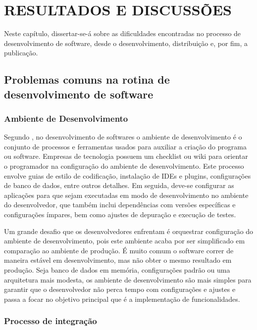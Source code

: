 \documentclass[
	12pt,				%
	openright,			%
	oneside,			%
	a4paper,			%
	chapter=TITLE,		%
	section=TITLE,		%
	english,			%
	french,				%
	spanish,			%
	brazil				%
	]{abntex2}
\begin{document}
\chapter{RESULTADOS E DISCUSSÕES}

Neste capítulo, dissertar-se-á sobre as dificuldades encontradas no processo de desenvolvimento de software, desde o desenvolvimento, distribuição e, por fim, a publicação.

\section{Problemas comuns na rotina de desenvolvimento de software}

\subsection{Ambiente de Desenvolvimento}

Segundo , no desenvolvimento de softwares o ambiente de desenvolvimento é o conjunto de processos e ferramentas usados para auxiliar a criação do programa ou software. Empresas de tecnologia possuem um checklist ou wiki para orientar o programador na configuração do ambiente de desenvolvimento. Este processo envolve guias de estilo de codificação, instalação de IDEs e plugins, configurações de banco de dados, entre outros detalhes. Em seguida, deve-se configurar as aplicações para que sejam executadas em modo de desenvolvimento no ambiente do desenvolvedor, que também inclui dependências com versões específicas e configurações ímpares, bem como ajustes de depuração e execução de testes.

Um grande desafio que os desenvolvedores enfrentam é orquestrar configuração do ambiente de desenvolvimento, pois este ambiente acaba por ser simplificado em comparação ao ambiente de produção. É muito comum o software correr de maneira estável em desenvolvimento, mas não obter o mesmo resultado em produção. Seja banco de dados em memória, configurações padrão ou uma arquitetura mais modesta, os ambiente de desenvolvimento são mais simples para garantir que o desenvolvedor não perca tempo com configurações e ajustes e passa a focar no objetivo principal que é a implementação de funcionalidades. 

\subsection{Processo de integração}
\end{document}
